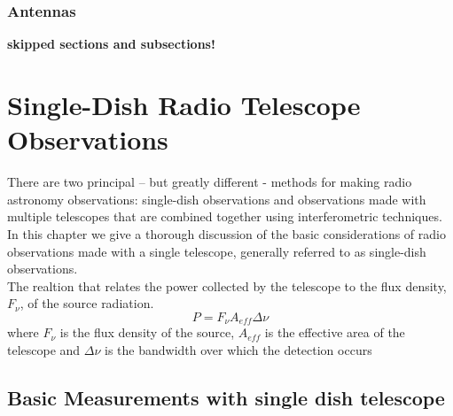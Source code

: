 \documentclass[10pt]{report}
\begin{document}
\subsection{Antennas}
\textbf{skipped sections and subsections!}
\chapter{Single-Dish Radio Telescope Observations}
There are two principal – but greatly different - methods for making radio astronomy observations:  single-dish observations and observations made with multiple telescopes that are combined together using interferometric techniques.  In this chapter we give a thorough discussion of the basic considerations of radio observations made with a single telescope, generally referred to as single-dish observations.\\
The realtion  that relates the power collected by the telescope to the flux density, $F_\nu$, of the source radiation.
\begin{equation}
P=F_\nu A_{eff}\Delta \nu
\end{equation}
where $F_\nu$ is the flux density of the source, $A_{eff}$ is the effective area of the telescope and $\Delta \nu$ is the bandwidth over which the detection occurs
\section{Basic Measurements with single dish telescope}
\end{document}
